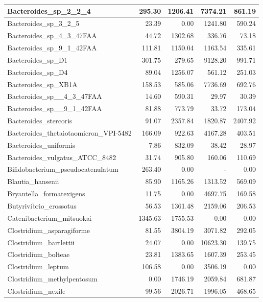 \documentclass[12pt,a4paper]{article}
\begin{document}
\begin{table}[ht]
\begin{center}
\begin{tabular}{|l*{4}{|r}|}
Bacteroides\_sp\_2\_2\_4 & 295.30 & 1206.41 & 7374.21 & 861.19 \\ \hline
Bacteroides\_sp\_3\_2\_5 & 23.39 & 0.00 & 1241.80 & 590.24 \\ \hline
Bacteroides\_sp\_4\_3\_47FAA & 44.72 & 1302.68 & 336.76 & 73.18 \\ \hline
Bacteroides\_sp\_9\_1\_42FAA & 111.81 & 1150.04 & 1163.54 & 335.61 \\ \hline
Bacteroides\_sp\_D1 & 301.75 & 279.65 & 9128.20 & 991.71 \\ \hline
Bacteroides\_sp\_D4 & 89.04 & 1256.07 & 561.12 & 251.03 \\ \hline
Bacteroides\_sp\_XB1A & 158.53 & 585.06 & 7736.69 & 692.76 \\ \hline
Bacteroides\_sp\_\_4\_3\_47FAA & 14.60 & 590.31 & 29.97 & 30.39 \\ \hline
Bacteroides\_sp\_\_9\_1\_42FAA & 81.88 & 773.79 & 33.72 & 173.04 \\ \hline
Bacteroides\_stercoris & 91.07 & 2357.84 & 1820.87 & 2407.92 \\ \hline
Bacteroides\_thetaiotaomicron\_VPI-5482 & 166.09 & 922.63 & 4167.28 & 403.51 \\ \hline
Bacteroides\_uniformis & 7.86 & 832.09 & 38.42 & 28.97 \\ \hline
Bacteroides\_vulgatus\_ATCC\_8482 & 31.74 & 905.80 & 160.06 & 110.69 \\ \hline
Bifidobacterium\_pseudocatenulatum & 263.40 & 0.00 & - & 0.00 \\ \hline
Blautia\_hansenii & 85.90 & 1165.26 & 1313.52 & 569.09 \\ \hline
Bryantella\_formatexigens & 11.75 & 0.00 & 4697.75 & 169.58 \\ \hline
Butyrivibrio\_crossotus & 56.53 & 1361.48 & 2159.06 & 206.53 \\ \hline
Catenibacterium\_mitsuokai & 1345.63 & 1755.53 & 0.00 & 0.00 \\ \hline
Clostridium\_asparagiforme & 81.55 & 3804.19 & 3071.82 & 292.05 \\ \hline
Clostridium\_bartlettii & 24.07 & 0.00 & 10623.30 & 139.75 \\ \hline
Clostridium\_bolteae & 23.81 & 1383.65 & 1607.39 & 253.45 \\ \hline
Clostridium\_leptum & 106.58 & 0.00 & 3506.19 & 0.00 \\ \hline
Clostridium\_methylpentosum & 0.00 & 1746.19 & 2059.84 & 681.87 \\ \hline
Clostridium\_nexile & 99.56 & 2026.71 & 1996.05 & 468.65 \\ \hline

\end{tabular}
\end{center}
\end{table}
\end{document}
